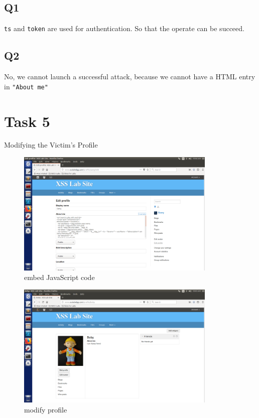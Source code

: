 \documentclass[onecolumn,oneside]{SUSTechHomework}
\begin{document}
    \subsection*{Q1}

      \verb|ts| and \verb|token| are used for authentication. So that the operate can be succeed.

    \subsection*{Q2}

      No, we cannot launch a successful attack, because we cannot have a HTML entry in \verb|"About me"|

  \section*{Task 5}
  Modifying the Victim’s Profile

  \begin{figure}[H]
    \centering
    \includegraphics[width=0.85\textwidth]{img/task5_1.png}
    \caption{embed JavaScript code} 
  \end{figure}

  \begin{figure}[H]
    \centering
    \includegraphics[width=0.85\textwidth]{img/task5_2.png}
    \caption{modify profile}
  \end{figure}
\end{document}
